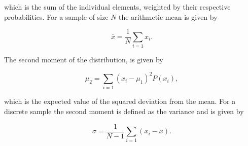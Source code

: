 \noindent which is the sum of the individual elements, weighted by their respective probabilities. For a sample of size $N$ the arithmetic mean is given by 

\begin{equation}
\bar{x} = \frac{1}{N}\sum_{i=1}{x_i}.
\end{equation}

\noindent The second moment of the distribution, is given by

\begin{equation}
\mu_2 = \sum_{i=1}{(x_i - \mu_1)^{2}P(x_i)},
\end{equation}

\noindent which is the expected value of the squared deviation from the mean. For a discrete sample the second moment is defined as the variance and is given by 

\begin{equation}
\sigma = \frac{1}{N-1}\sum_{i=1}{(x_i - \bar{x})}.
\end{equation}

